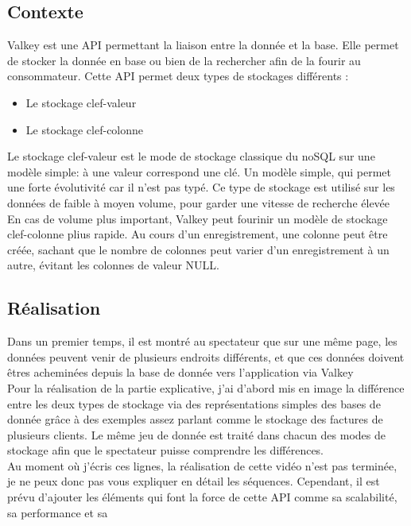 \subsection{Contexte}
Valkey est une API permettant la liaison entre la donnée et la base. Elle permet de stocker la donnée en base ou bien de la rechercher afin de la fourir au consommateur. Cette API permet deux types de stockages différents :\\
\begin{itemize}
\item Le stockage clef-valeur
\item Le stockage clef-colonne
\end{itemize}

Le stockage clef-valeur est le mode  de stockage classique du noSQL sur une modèle simple: à une valeur correspond une clé. Un modèle simple, qui permet une forte évolutivité car il n'est pas typé. Ce type de stockage est utilisé sur les données de faible à moyen volume, pour garder une vitesse de recherche élevée\\

En cas de volume plus important, Valkey peut fourinir un modèle de stockage clef-colonne plius rapide. Au cours d’un enregistrement, une colonne peut être créée, sachant que le nombre de colonnes peut varier d’un enregistrement à un autre, évitant les colonnes de valeur NULL.\\


\subsection{Réalisation}

Dans un premier temps, il est montré au spectateur que sur une même page, les données peuvent venir de plusieurs endroits différents, et que ces données doivent êtres acheminées depuis la base de donnée vers l'application via Valkey\\

Pour la réalisation de la partie explicative, j'ai d'abord mis en image la différence entre les deux types de stockage via des représentations simples des bases de donnée grâce à des exemples assez parlant comme le stockage des factures de plusieurs clients. Le même jeu de donnée est traité dans chacun des modes de stockage afin que le spectateur puisse comprendre les différences.\\

Au moment où j'écris ces lignes, la réalisation de cette vidéo n'est pas terminée, je ne peux donc pas vous expliquer en détail les séquences. Cependant, il est prévu d'ajouter les éléments qui font la force de cette API comme sa scalabilité, sa performance et sa 



